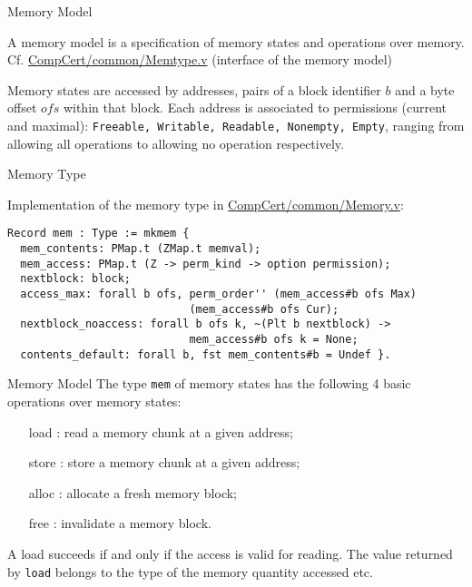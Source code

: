 \documentclass{beamer}
\begin{document}
\begin{frame}[fragile]{Memory Model}

  A memory model is a specification of memory states and operations over memory. Cf. \url{CompCert/common/Memtype.v} (interface of the memory model)
  
\bigskip
  
   Memory states are accessed by addresses, pairs of a block
  identifier $b$ and a byte offset $ofs$ within that block.
  Each address is associated to permissions (current and maximal): \texttt{Freeable, Writable, Readable, Nonempty, Empty}, ranging from allowing all operations to allowing no operation respectively.
\end{frame}

\begin{frame}[fragile]{Memory Type}

Implementation of the memory type in \url{CompCert/common/Memory.v}: 
  
  \begin{lstlisting}[language=Coq]
Record mem : Type := mkmem {
  mem_contents: PMap.t (ZMap.t memval);  
  mem_access: PMap.t (Z -> perm_kind -> option permission);
  nextblock: block;
  access_max: forall b ofs, perm_order'' (mem_access#b ofs Max)
                            (mem_access#b ofs Cur);
  nextblock_noaccess: forall b ofs k, ~(Plt b nextblock) ->
                            mem_access#b ofs k = None;
  contents_default: forall b, fst mem_contents#b = Undef }.

\end{lstlisting}


\end{frame}

\begin{frame}{Memory Model}
  The type \texttt{mem} of memory states has  the following 4 basic operations over memory states:
  \bigskip
  
\begin{itemize}
\item [load]: read a memory chunk at a given address;
\item [store]: store a memory chunk at a given address;
\item [alloc]: allocate a fresh memory block;
\item [free]: invalidate a memory block.
\end{itemize}
\bigskip
A load succeeds if and only if the access is valid for reading. The value returned by \texttt{load} belongs to the type of the memory quantity accessed etc. 



\end{frame}
\end{document}

